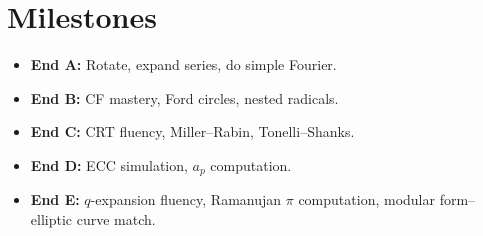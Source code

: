 \documentclass[11pt]{article}
\begin{document}
\section*{Milestones}
\begin{itemize}
\item \textbf{End A:} Rotate, expand series, do simple Fourier.
\item \textbf{End B:} CF mastery, Ford circles, nested radicals.
\item \textbf{End C:} CRT fluency, Miller--Rabin, Tonelli--Shanks.
\item \textbf{End D:} ECC simulation, $a_p$ computation.
\item \textbf{End E:} $q$-expansion fluency, Ramanujan $\pi$ computation, modular form--elliptic curve match.
\end{itemize}
\end{document}
